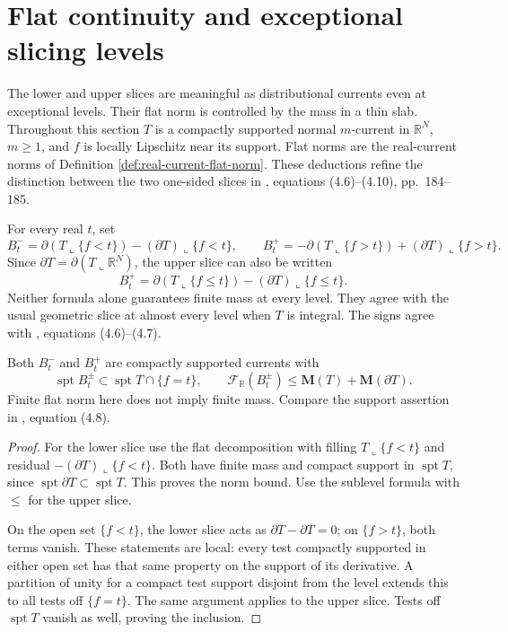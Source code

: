 \chapter{Flat continuity and exceptional slicing levels}\label{sec:slice-flat-continuity}
The lower and upper slices are meaningful as distributional currents even at exceptional levels. Their flat norm is controlled by the mass in a thin slab. Throughout this section $T$ is a compactly supported normal $m$-current in $\mathbb R^N$, $m\geq1$, and $f$ is locally Lipschitz near its support. Flat norms are the real-current norms of Definition \ref{def:real-current-flat-norm}. These deductions refine the distinction between the two one-sided slices in \cite{Sim18}, equations (4.6)--(4.10), pp.~184--185.

\begin{definition}\label{def:two-sided-current-slices}
For every real $t$, set
\[
 B_t^- =\partial(T\llcorner\{f<t\})-(\partial T)\llcorner\{f<t\},
 \qquad
 B_t^+ =-\partial(T\llcorner\{f>t\})+(\partial T)\llcorner\{f>t\}.
\]
Since $\partial T=\partial(T\llcorner\mathbb R^N)$, the upper slice can also be written
\[
 B_t^+=\partial(T\llcorner\{f\leq t\})-(\partial T)\llcorner\{f\leq t\}.
\]
Neither formula alone guarantees finite mass at every level. They agree with the usual geometric slice at almost every level when $T$ is integral. The signs agree with \cite{Sim18}, equations (4.6)--(4.7).
\end{definition}

\begin{proposition}\label{prop:all-level-slice-support-flat}
Both $B_t^-$ and $B_t^+$ are compactly supported currents with
\[
 \operatorname{spt}B_t^\pm\subset\operatorname{spt}T\cap\{f=t\},
 \qquad
 \mathcal F_{\mathbb R}(B_t^\pm)
 \leq\mathbf M(T)+\mathbf M(\partial T).
\]
Finite flat norm here does not imply finite mass. Compare the support assertion in \cite{Sim18}, equation (4.8).
\end{proposition}
\begin{proof}
For the lower slice use the flat decomposition with filling $T\llcorner\{f<t\}$ and residual $-(\partial T)\llcorner\{f<t\}$. Both have finite mass and compact support in $\operatorname{spt}T$, since $\operatorname{spt}\partial T\subset\operatorname{spt}T$. This proves the norm bound. Use the sublevel formula with $\leq$ for the upper slice.

On the open set $\{f<t\}$, the lower slice acts as $\partial T-\partial T=0$; on $\{f>t\}$, both terms vanish. These statements are local: every test compactly supported in either open set has that same property on the support of its derivative. A partition of unity for a compact test support disjoint from the level extends this to all tests off $\{f=t\}$. The same argument applies to the upper slice. Tests off $\operatorname{spt}T$ vanish as well, proving the inclusion.
\end{proof}

